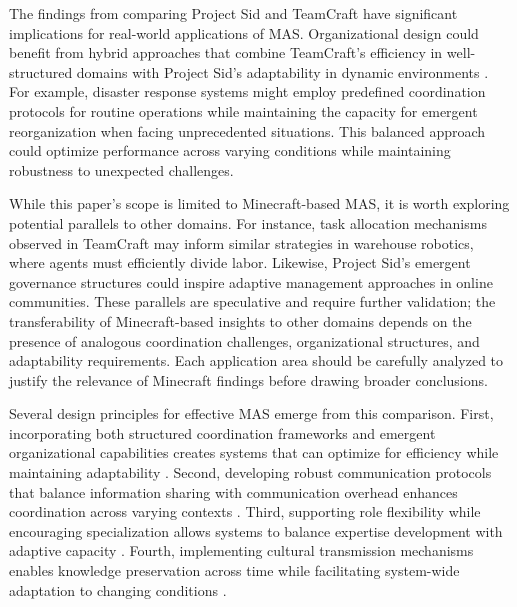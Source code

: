 \documentclass[a4paper, 12pt]{article}
\begin{document}
The findings from comparing Project Sid and TeamCraft have significant implications for real-world applications of MAS. Organizational design could benefit from hybrid approaches that combine TeamCraft's efficiency in well-structured domains with Project Sid's adaptability in dynamic environments \autocite{long2024teamcraftbenchmarkmultimodalmultiagent,al2024projectsidmanyagentsimulations}. For example, disaster response systems might employ predefined coordination protocols for routine operations while maintaining the capacity for emergent reorganization when facing unprecedented situations. This balanced approach could optimize performance across varying conditions while maintaining robustness to unexpected challenges.

While this paper's scope is limited to Minecraft-based MAS, it is worth exploring potential parallels to other domains. For instance, task allocation mechanisms observed in TeamCraft may inform similar strategies in warehouse robotics, where agents must efficiently divide labor. Likewise, Project Sid's emergent governance structures could inspire adaptive management approaches in online communities. These parallels are speculative and require further validation; the transferability of Minecraft-based insights to other domains depends on the presence of analogous coordination challenges, organizational structures, and adaptability requirements. Each application area should be carefully analyzed to justify the relevance of Minecraft findings before drawing broader conclusions.

Several design principles for effective MAS emerge from this comparison. First, incorporating both structured coordination frameworks and emergent organizational capabilities creates systems that can optimize for efficiency while maintaining adaptability \autocite{chen2024sagentsselforganizingagentsopenended,qiu2024collaborativeintelligencepropagatingintentions}. Second, developing robust communication protocols that balance information sharing with communication overhead enhances coordination across varying contexts \autocite{shu2024effectivegenaimultiagentcollaboration,qiu2024collaborativeintelligencepropagatingintentions}. Third, supporting role flexibility while encouraging specialization allows systems to balance expertise development with adaptive capacity \autocite{al2024projectsidmanyagentsimulations,long2024teamcraftbenchmarkmultimodalmultiagent}. Fourth, implementing cultural transmission mechanisms enables knowledge preservation across time while facilitating system-wide adaptation to changing conditions \autocite{al2024projectsidmanyagentsimulations}.
\end{document}
